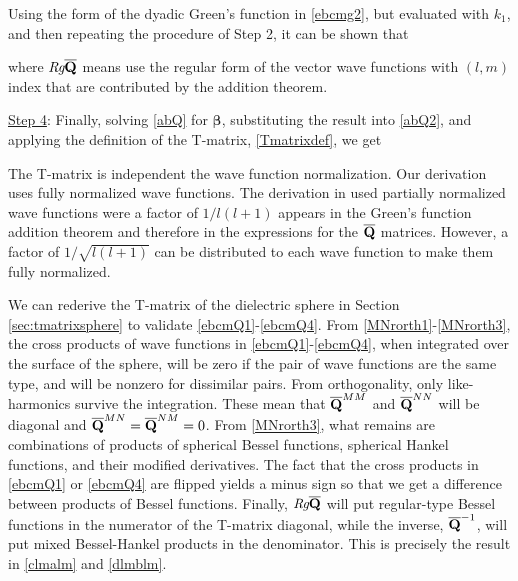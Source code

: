 Using the form of the dyadic Green's function in \eqref{ebcmg2}, but evaluated with $k_1$, and then repeating the procedure of Step 2, it can be shown that 

\noindent where $\textit{Rg}\overline{\mathbf{Q}}$ means use the regular form of the vector wave functions with $(l,m)$ index that are contributed by the addition theorem. 

\underline{Step 4}: Finally, solving \eqref{abQ} for $\boldsymbol{\beta}$, substituting the result into \eqref{abQ2}, and applying the definition of the T-matrix, \eqref{Tmatrixdef}, we get  


The T-matrix is independent the wave function normalization. Our derivation uses fully normalized wave functions. The derivation in \cite{duan2015experimental} used partially normalized wave functions were a factor of $1/l(l+1)$ appears in the Green's function addition theorem and therefore in the expressions for the $\overline{\mathbf{Q}}$ matrices. However, a factor of $1/\sqrt{l(l+1)}$ can be distributed to each wave function to make them fully normalized. %

We can rederive the T-matrix of the dielectric sphere in Section \ref{sec:tmatrixsphere} to validate \eqref{ebcmQ1}-\eqref{ebcmQ4}. From \eqref{MNrorth1}-\eqref{MNrorth3}, the cross products of wave functions in \eqref{ebcmQ1}-\eqref{ebcmQ4}, when integrated over the surface of the sphere, will be zero if the pair of wave functions are the same type, and will be nonzero for dissimilar pairs. From orthogonality, only like-harmonics survive the integration. These mean that $\overline{\mathbf{Q}}^{MM}$ and $\overline{\mathbf{Q}}^{NN}$ will be diagonal and $\overline{\mathbf{Q}}^{MN} = \overline{\mathbf{Q}}^{NM} = 0$. From \eqref{MNrorth3}, what remains are combinations of products of spherical Bessel functions, spherical Hankel functions, and their modified derivatives. The fact that the cross products in \eqref{ebcmQ1} or \eqref{ebcmQ4} are flipped yields a minus sign so that we get a difference between products of Bessel functions. Finally, $\textit{Rg}\overline{\mathbf{Q}}$ will put regular-type Bessel functions in the numerator of the T-matrix diagonal, while the inverse, $\overline{\mathbf{Q}}^{-1}$, will put mixed Bessel-Hankel products in the denominator. This is precisely the result in \eqref{clmalm} and \eqref{dlmblm}.  

